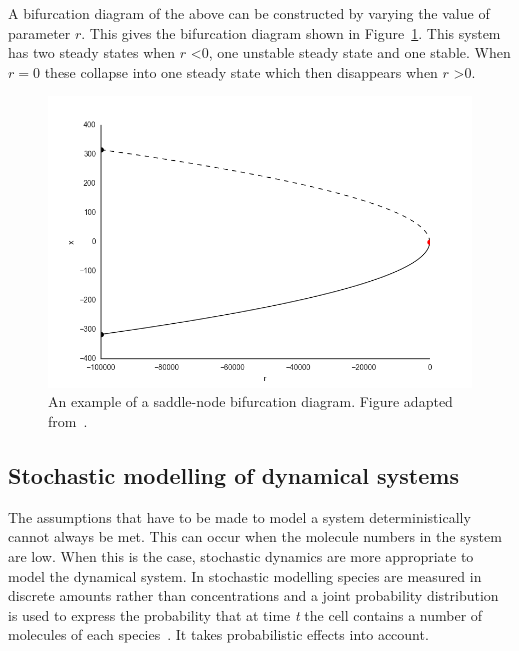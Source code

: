 \noindent A bifurcation diagram of the above can be constructed by varying the value of parameter $r$. This gives the bifurcation diagram shown in Figure~\ref{fig:exampl_bifurc}. This system has two steady states when $r$ \textless 0, one unstable steady state and one stable. When $r = 0$ these collapse into one steady state which then disappears when $r$ \textgreater 0. 
\newpage
\begin{figure}[h]
    \begin{center}
    \includegraphics[scale=0.5]{../../chapters/chapterBackgr/images/example_bifurc.png}
    \caption[Example of a saddle-node bifurcation diagram]{An example of a saddle-node bifurcation diagram. Figure adapted from~\textcite{Strogatz:1994}.}
    \label{fig:exampl_bifurc}
    \end{center}
\end{figure}




\subsection{Stochastic modelling of dynamical systems}

The assumptions that have to be made to model a system deterministically cannot always be met. This can occur when the molecule numbers in the system are low. When this is the case, stochastic dynamics are more appropriate to model the dynamical system. In stochastic modelling species are measured in discrete amounts rather than concentrations and a joint probability distribution is used to express the probability that at time \textit{t} the cell contains a number of molecules of each species~\autocite{deJong:2002ft,khamash_iglesias:2010}. It takes probabilistic effects into account. 

